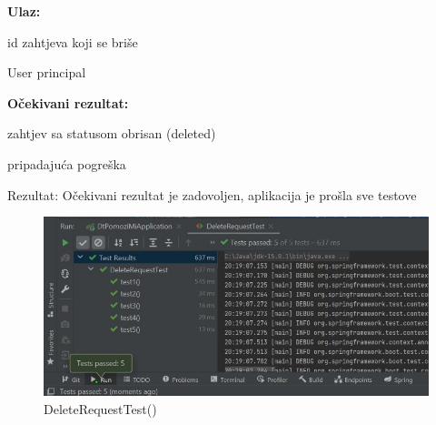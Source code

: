 			\medskip
            \noindent\textbf{Ulaz:}
            \begin{packed_enum}
            \item id zahtjeva koji se briše
            \item User principal
            \end{packed_enum}
            
            \noindent\textbf{Očekivani rezultat:}
            \begin{packed_enum}
            \item zahtjev sa statusom obrisan (deleted)
            \item pripadajuća pogreška
            \end{packed_enum}
            
            \noindent \text
            Rezultat: Očekivani rezultat je zadovoljen, aplikacija je prošla sve testove \\
            
            \begin{figure}[H]
                 \includegraphics[width=\textwidth, height=\textheight, keepaspectratio]{slike/DeleteRequestTest.jpeg}
                \centering
                \caption{DeleteRequestTest()}
            \end{figure}
            
